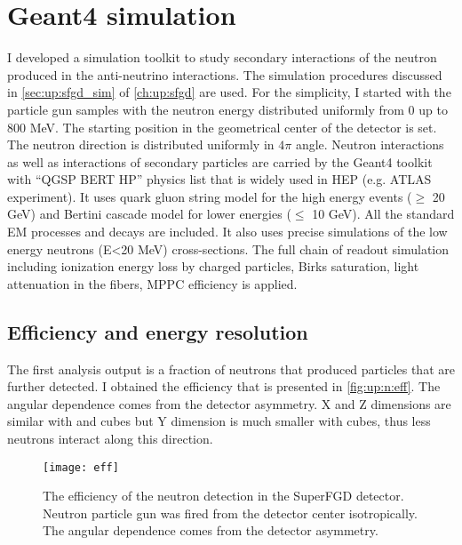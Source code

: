 \documentclass[main.tex]{subfiles}
\begin{document}
\section{Geant4 simulation}
I developed a simulation toolkit to study secondary interactions of the neutron produced in the anti-neutrino interactions. The simulation procedures discussed in \autoref{sec:up:sfgd_sim} of \autoref{ch:up:sfgd} are used. For the simplicity, I started with the particle gun samples with the neutron energy distributed uniformly from 0 up to 800 MeV. The starting position in the geometrical center of the detector is set. The neutron direction is distributed uniformly in $4\pi$ angle. Neutron interactions as well as interactions of secondary particles are carried by the Geant4 toolkit with ``QGSP BERT HP'' physics list that is widely used in HEP (e.g. ATLAS experiment). It uses quark gluon string model for the high energy events ($\geqslant$ 20 GeV) and Bertini cascade model for lower energies ($\leqslant$ 10 GeV). All the standard EM processes and decays are included. It also uses precise simulations of the low energy neutrons (E<20 MeV) cross-sections. The full chain of readout simulation including ionization energy loss by charged particles, Birks saturation, light attenuation in the fibers, MPPC efficiency is applied.

\subsection{Efficiency and energy resolution}
The first analysis output is a fraction of neutrons that produced particles that are further detected. I obtained the efficiency that is presented in \autoref{fig:up:n:eff}. The angular dependence comes from the detector asymmetry. X and Z dimensions are similar with \sfgdx{} and \sfgdz{} cubes but Y dimension is much smaller with \sfgdy{} cubes, thus less neutrons interact along this direction.

\begin{figure}[!ht]
	\centering
	\texttt{[image: eff]}
	\caption{The efficiency of the neutron detection in the SuperFGD detector. Neutron particle gun was fired from the detector center isotropically. The angular dependence comes from the detector asymmetry.}
	\label{fig:up:n:eff}
\end{figure}
\end{document}
